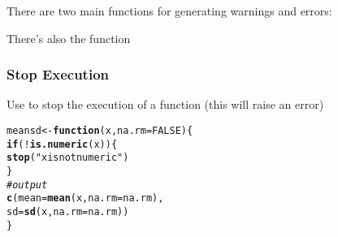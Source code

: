 \documentclass[12pt]{beamer}\usepackage[]{graphicx}\usepackage[]{color}
\makeatletter
\newcommand{\hlnum}[1]{\textcolor[rgb]{0.686,0.059,0.569}{#1}}%
\newcommand{\hlstr}[1]{\textcolor[rgb]{0.192,0.494,0.8}{#1}}%
\newcommand{\hlcom}[1]{\textcolor[rgb]{0.678,0.584,0.686}{\textit{#1}}}%
\newcommand{\hlopt}[1]{\textcolor[rgb]{0,0,0}{#1}}%
\newcommand{\hlstd}[1]{\textcolor[rgb]{0.345,0.345,0.345}{#1}}%
\newcommand{\hlkwa}[1]{\textcolor[rgb]{0.161,0.373,0.58}{\textbf{#1}}}%
\newcommand{\hlkwb}[1]{\textcolor[rgb]{0.69,0.353,0.396}{#1}}%
\newcommand{\hlkwc}[1]{\textcolor[rgb]{0.333,0.667,0.333}{#1}}%
\newcommand{\hlkwd}[1]{\textcolor[rgb]{0.737,0.353,0.396}{\textbf{#1}}}%
\newenvironment{kframe}{%
 \def\at@end@of@kframe{}%
 \ifinner\ifhmode%
  \def\at@end@of@kframe{\end{minipage}}%
  \begin{minipage}{\columnwidth}%
 \fi\fi%
 \def\FrameCommand##1{\hskip\@totalleftmargin \hskip-\fboxsep
 \colorbox{shadecolor}{##1}\hskip-\fboxsep
     \hskip-\linewidth \hskip-\@totalleftmargin \hskip\columnwidth}%
 \MakeFramed {\advance\hsize-\width
   \@totalleftmargin\z@ \linewidth\hsize
   \@setminipage}}%
 {\par\unskip\endMakeFramed%
 \at@end@of@kframe}
\newenvironment{knitrout}{}{} %
\makeatother
\begin{document}

\begin{frame}
\begin{center}
\Huge{}
\end{center}
\end{frame}


\begin{frame}[fragile]
\frametitle{}

There are two main functions for generating warnings and errors:
\bbi
  \item {\hilit {}}
  \item {\hilit {}}
\ei

\bigskip
{\footnotesize There's also the {\hilit {}} function}

\end{frame}


\begin{frame}[fragile]
\frametitle{Stop Execution}

Use {\hilit {}} to stop the execution of a function (this will raise an error)
\begin{knitrout}\footnotesize
{}\color{fgcolor}\begin{kframe}
\begin{alltt}
\hlstd{meansd} \hlkwb{<-} \hlkwa{function}\hlstd{(}\hlkwc{x}\hlstd{,} \hlkwc{na.rm} \hlstd{=} \hlnum{FALSE}\hlstd{) \{}
  \hlkwa{if} \hlstd{(}\hlopt{!}\hlkwd{is.numeric}\hlstd{(x)) \{}
    \hlkwd{stop}\hlstd{(}\hlstr{"x is not numeric"}\hlstd{)}
  \hlstd{\}}
  \hlcom{# output}
  \hlkwd{c}\hlstd{(}\hlkwc{mean} \hlstd{=} \hlkwd{mean}\hlstd{(x,} \hlkwc{na.rm} \hlstd{= na.rm),}
    \hlkwc{sd} \hlstd{=} \hlkwd{sd}\hlstd{(x,} \hlkwc{na.rm} \hlstd{= na.rm))}
\hlstd{\}}
\end{alltt}
\end{kframe}
\end{knitrout}

\end{frame}

\end{document}
